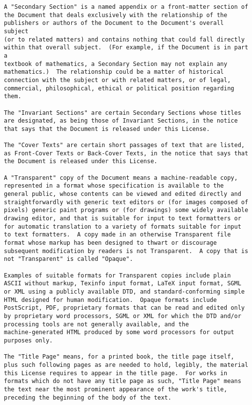 \documentclass[12pt]{article}
\begin{document}
\begin{verbatim}
A "Secondary Section" is a named appendix or a front-matter section of
the Document that deals exclusively with the relationship of the
publishers or authors of the Document to the Document's overall subject
(or to related matters) and contains nothing that could fall directly
within that overall subject.  (For example, if the Document is in part a
textbook of mathematics, a Secondary Section may not explain any
mathematics.)  The relationship could be a matter of historical
connection with the subject or with related matters, or of legal,
commercial, philosophical, ethical or political position regarding
them.

The "Invariant Sections" are certain Secondary Sections whose titles
are designated, as being those of Invariant Sections, in the notice
that says that the Document is released under this License.

The "Cover Texts" are certain short passages of text that are listed,
as Front-Cover Texts or Back-Cover Texts, in the notice that says that
the Document is released under this License.

A "Transparent" copy of the Document means a machine-readable copy,
represented in a format whose specification is available to the
general public, whose contents can be viewed and edited directly and
straightforwardly with generic text editors or (for images composed of
pixels) generic paint programs or (for drawings) some widely available
drawing editor, and that is suitable for input to text formatters or
for automatic translation to a variety of formats suitable for input
to text formatters.  A copy made in an otherwise Transparent file
format whose markup has been designed to thwart or discourage
subsequent modification by readers is not Transparent.  A copy that is
not "Transparent" is called "Opaque".

Examples of suitable formats for Transparent copies include plain
ASCII without markup, Texinfo input format, LaTeX input format, SGML
or XML using a publicly available DTD, and standard-conforming simple
HTML designed for human modification.  Opaque formats include
PostScript, PDF, proprietary formats that can be read and edited only
by proprietary word processors, SGML or XML for which the DTD and/or
processing tools are not generally available, and the
machine-generated HTML produced by some word processors for output
purposes only.

The "Title Page" means, for a printed book, the title page itself,
plus such following pages as are needed to hold, legibly, the material
this License requires to appear in the title page.  For works in
formats which do not have any title page as such, "Title Page" means
the text near the most prominent appearance of the work's title,
preceding the beginning of the body of the text.



\end{verbatim}
\end{document}

